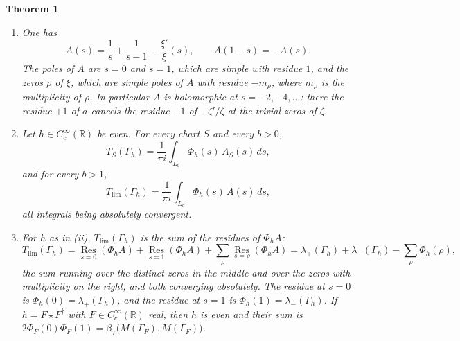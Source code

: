 \documentclass[11pt]{amsart}
\newtheorem{theorem}{Theorem}[section]
\theoremstyle{remark}
\numberwithin{equation}{section}
\newcommand{\R}{\mathbb R}
\newcommand{\Res}{\operatorname*{Res}}
\newcommand{\Tl}{T_{\lim}}
\begin{document}
\begin{theorem}
\label{thm:residues}
\begin{enumerate}
\item[(i)] One has
\begin{equation}
\label{eq:Axi}
  A(s)=\frac1s+\frac1{s-1}-\frac{\xi'}{\xi}(s),\qquad A(1-s)=-A(s).
\end{equation}
The poles of $A$ are $s=0$ and $s=1$, which are simple with residue $1$, and
the zeros $\rho$ of $\xi$, which are simple poles of $A$ with residue
$-m_\rho$, where $m_\rho$ is the multiplicity of $\rho$.  In particular
$A$ is holomorphic at $s=-2,-4,\dots$: there the residue $+1$ of $a$ cancels
the residue $-1$ of $-\zeta'/\zeta$ at the trivial zeros of $\zeta$.
\item[(ii)] Let $h\in C_c^\infty(\R)$ be even.  For every chart $S$ and every
$b>0$,
\begin{equation}
\label{eq:lineS}
  T_S(\Gamma_h)=\frac1{\pi i}\int_{L_b}\Phi_h(s)\,A_S(s)\,ds ,
\end{equation}
and for every $b>1$,
\begin{equation}
\label{eq:lineinf}
  \Tl(\Gamma_h)=\frac1{\pi i}\int_{L_b}\Phi_h(s)\,A(s)\,ds ,
\end{equation}
all integrals being absolutely convergent.
\item[(iii)] For $h$ as in \emph{(ii)}, $\Tl(\Gamma_h)$ is the sum of the
residues of $\Phi_hA$:
\begin{equation}
\label{eq:residuesum}
  \Tl(\Gamma_h)
  =\Res_{s=0}(\Phi_hA)+\Res_{s=1}(\Phi_hA)+\sum_\rho\Res_{s=\rho}(\Phi_hA)
  =\lambda_+(\Gamma_h)+\lambda_-(\Gamma_h)-\sum_\rho\Phi_h(\rho),
\end{equation}
the sum running over the distinct zeros in the middle and over the zeros
with multiplicity on the right, and both converging absolutely.  The residue
at $s=0$ is $\Phi_h(0)=\lambda_+(\Gamma_h)$, and the residue at $s=1$ is
$\Phi_h(1)=\lambda_-(\Gamma_h)$.  If $h=F\star F^\dagger$ with
$F\in C_c^\infty(\R)$ real, then $h$ is even and their sum is
$2\Phi_F(0)\Phi_F(1)=\beta_T\bigl(M(\Gamma_F),M(\Gamma_F)\bigr)$.
\end{enumerate}
\end{theorem}
\end{document}
